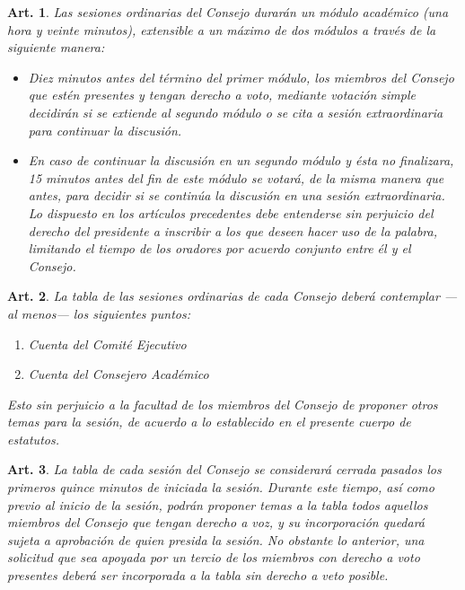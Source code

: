 \documentclass[letterpaper,11pt]{article}
\theoremstyle{plain}
\newtheorem{art}{Art.} %
\begin{document}
			\begin{art}\label{duracionConsejosOrdinarios}
				Las sesiones ordinarias del Consejo durarán un módulo académico (una hora y veinte minutos), extensible a un máximo de dos módulos a través de la siguiente manera:
				\begin{itemize}
					\item Diez minutos antes del término del primer módulo, los miembros del Consejo que estén presentes y tengan derecho a voto, mediante votación simple decidirán si se extiende al segundo módulo o se cita a sesión extraordinaria para continuar la discusión.
					\item En caso de continuar la discusión en un segundo módulo y ésta no finalizara, 15 minutos antes del fin de este módulo se votará, de la misma manera que antes, para decidir si se continúa la discusión en una sesión extraordinaria. Lo dispuesto en los artículos precedentes debe entenderse sin perjuicio del derecho del presidente a inscribir a los que deseen hacer uso de la palabra, limitando el tiempo de los oradores por acuerdo conjunto entre él y el Consejo.
				\end{itemize}
			\end{art}

			\begin{art}\label{cuentasPublicasOrdinarias}
				La tabla de las sesiones ordinarias de cada Consejo deberá contemplar ---al menos--- los siguientes puntos:
				\begin{enumerate}
					\item Cuenta del Comité Ejecutivo
					\item Cuenta del Consejero Académico
				\end{enumerate}
				Esto sin perjuicio a la facultad de los miembros del Consejo de proponer otros temas para la sesión, de acuerdo a lo establecido en el presente cuerpo de estatutos.
			\end{art}

			\begin{art}\label{definicionTabla}
				La tabla de cada sesión del Consejo se considerará cerrada pasados los primeros quince minutos de iniciada la sesión. Durante este tiempo, así como previo al inicio de la sesión, podrán proponer temas a la tabla todos aquellos miembros del Consejo que tengan derecho a voz, y su incorporación quedará sujeta a aprobación de quien presida la sesión. No obstante lo anterior, una solicitud que sea apoyada por un tercio de los miembros con derecho a voto presentes deberá ser incorporada a la tabla sin derecho a veto posible.
			\end{art}
\end{document}
